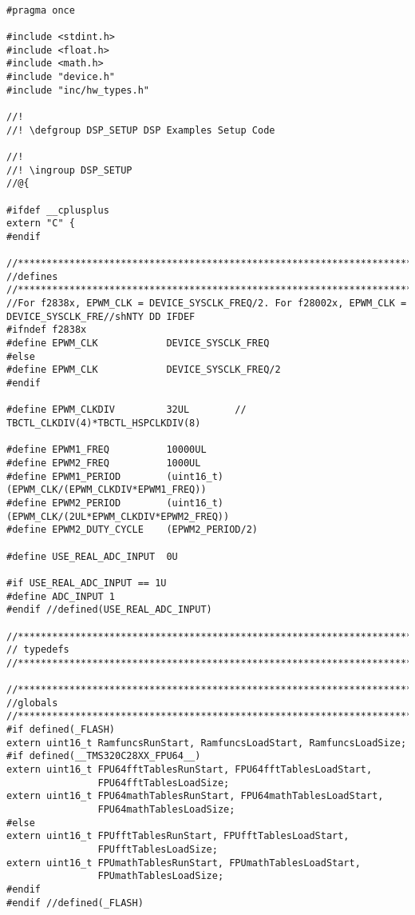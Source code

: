 \begin{lstlisting}[caption=\raggedright{mcu-libs/RLS.h}, frame=single]

#pragma once

#include <stdint.h>
#include <float.h>
#include <math.h>
#include "device.h"
#include "inc/hw_types.h"

//!
//! \defgroup DSP_SETUP DSP Examples Setup Code

//!
//! \ingroup DSP_SETUP
//@{

#ifdef __cplusplus
extern "C" {
#endif

//*****************************************************************************
//defines
//*****************************************************************************
//For f2838x, EPWM_CLK = DEVICE_SYSCLK_FREQ/2. For f28002x, EPWM_CLK = DEVICE_SYSCLK_FRE//shNTY DD IFDEF
#ifndef f2838x
#define EPWM_CLK            DEVICE_SYSCLK_FREQ
#else
#define EPWM_CLK            DEVICE_SYSCLK_FREQ/2
#endif

#define EPWM_CLKDIV         32UL        // TBCTL_CLKDIV(4)*TBCTL_HSPCLKDIV(8)

#define EPWM1_FREQ          10000UL
#define EPWM2_FREQ          1000UL
#define EPWM1_PERIOD        (uint16_t)(EPWM_CLK/(EPWM_CLKDIV*EPWM1_FREQ))
#define EPWM2_PERIOD        (uint16_t)(EPWM_CLK/(2UL*EPWM_CLKDIV*EPWM2_FREQ))
#define EPWM2_DUTY_CYCLE    (EPWM2_PERIOD/2)

#define USE_REAL_ADC_INPUT  0U

#if USE_REAL_ADC_INPUT == 1U
#define ADC_INPUT 1
#endif //defined(USE_REAL_ADC_INPUT)

//*****************************************************************************
// typedefs
//*****************************************************************************

//*****************************************************************************
//globals
//*****************************************************************************
#if defined(_FLASH)
extern uint16_t RamfuncsRunStart, RamfuncsLoadStart, RamfuncsLoadSize;
#if defined(__TMS320C28XX_FPU64__)
extern uint16_t FPU64fftTablesRunStart, FPU64fftTablesLoadStart,
                FPU64fftTablesLoadSize;
extern uint16_t FPU64mathTablesRunStart, FPU64mathTablesLoadStart,
                FPU64mathTablesLoadSize;
#else
extern uint16_t FPUfftTablesRunStart, FPUfftTablesLoadStart,
                FPUfftTablesLoadSize;
extern uint16_t FPUmathTablesRunStart, FPUmathTablesLoadStart,
                FPUmathTablesLoadSize;
#endif
#endif //defined(_FLASH)


\end{lstlisting}

